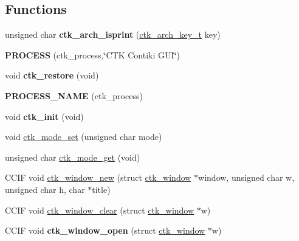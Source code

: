 \subsection*{Functions}
\begin{DoxyCompactItemize}
\item 
\hypertarget{group__ctk_ga81ac3d26813202ec06b6bc96d7d6167c}{}unsigned char {\bfseries ctk\+\_\+arch\+\_\+isprint} (\hyperlink{group__ctkdraw_gaa6eb41324497b3d828d208c0efa6fa90}{ctk\+\_\+arch\+\_\+key\+\_\+t} key)\label{group__ctk_ga81ac3d26813202ec06b6bc96d7d6167c}

\item 
\hypertarget{group__ctk_ga6cb631c335ff8e78106fd0bc57c379e0}{}{\bfseries P\+R\+O\+C\+E\+S\+S} (ctk\+\_\+process,\char`\"{}C\+T\+K Contiki G\+U\+I\char`\"{})\label{group__ctk_ga6cb631c335ff8e78106fd0bc57c379e0}

\item 
\hypertarget{group__ctk_ga265bac2d644dc564d7e887514b452d3f}{}void {\bfseries ctk\+\_\+restore} (void)\label{group__ctk_ga265bac2d644dc564d7e887514b452d3f}

\item 
\hypertarget{group__ctk_ga0f24fa9fdd46f7358d8976c87cd480f4}{}{\bfseries P\+R\+O\+C\+E\+S\+S\+\_\+\+N\+A\+M\+E} (ctk\+\_\+process)\label{group__ctk_ga0f24fa9fdd46f7358d8976c87cd480f4}

\item 
\hypertarget{group__ctk_ga391a764fb1a032cc300a207ea7dd44d2}{}void {\bfseries ctk\+\_\+init} (void)\label{group__ctk_ga391a764fb1a032cc300a207ea7dd44d2}

\item 
void \hyperlink{group__ctk_ga076ec13a5d4d6f0eec67e885278180c2}{ctk\+\_\+mode\+\_\+set} (unsigned char mode)
\item 
unsigned char \hyperlink{group__ctk_ga26d7427d7f920ce4e3293f1a8dd959f3}{ctk\+\_\+mode\+\_\+get} (void)
\item 
C\+C\+I\+F void \hyperlink{group__ctk_ga57b2761bf532a4041be73710ed080735}{ctk\+\_\+window\+\_\+new} (struct \hyperlink{structctk__window}{ctk\+\_\+window} $\ast$window, unsigned char w, unsigned char h, char $\ast$title)
\item 
C\+C\+I\+F void \hyperlink{group__ctk_gaf89a958d44ea1e49908ddd03c710cd4f}{ctk\+\_\+window\+\_\+clear} (struct \hyperlink{structctk__window}{ctk\+\_\+window} $\ast$w)
\item 
\hypertarget{group__ctk_ga9f120975de2fcc02f436637898f116b5}{}C\+C\+I\+F void {\bfseries ctk\+\_\+window\+\_\+open} (struct \hyperlink{structctk__window}{ctk\+\_\+window} $\ast$w)\label{group__ctk_ga9f120975de2fcc02f436637898f116b5}


\end{DoxyCompactItemize}
